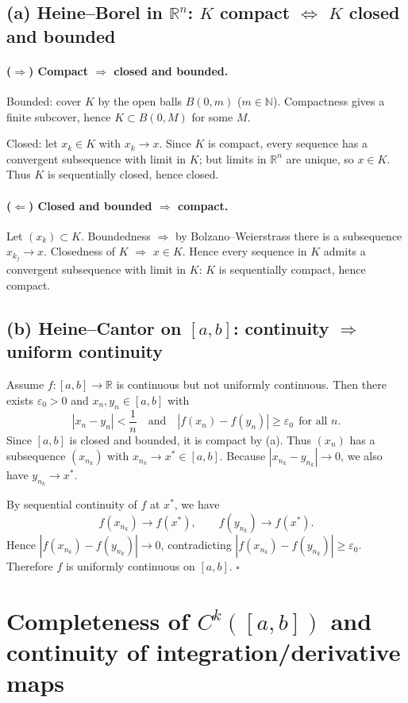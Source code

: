 \documentclass[12pt,a4paper]{article}
\newcommand{\qed}{\hfill$\square$}
\begin{document}
\subsection*{(a) Heine--Borel in $\mathbb{R}^n$: $K$ compact $\iff$ $K$ closed and bounded}

\paragraph{($\Rightarrow$) Compact $\Rightarrow$ closed and bounded.}
Bounded: cover $K$ by the open balls $B(0,m)$ ($m\in\mathbb{N}$). Compactness gives a finite subcover, hence
$K\subset B(0,M)$ for some $M$.

Closed: let $x_k\in K$ with $x_k\to x$. Since $K$ is compact, every sequence has a convergent subsequence
with limit in $K$; but limits in $\mathbb{R}^n$ are unique, so $x\in K$. Thus $K$ is sequentially closed, hence closed.

\paragraph{($\Leftarrow$) Closed and bounded $\Rightarrow$ compact.}
Let $(x_k)\subset K$. Boundedness $\Rightarrow$ by Bolzano--Weierstrass there is a subsequence $x_{k_j}\to x$.
Closedness of $K$ $\Rightarrow$ $x\in K$. Hence every sequence in $K$ admits a convergent subsequence with
limit in $K$: $K$ is sequentially compact, hence compact.

\subsection*{(b) Heine--Cantor on $[a,b]$: continuity $\Rightarrow$ uniform continuity}
Assume $f:[a,b]\to\mathbb{R}$ is continuous but not uniformly continuous. Then there exists $\varepsilon_0>0$
and $x_n,y_n\in[a,b]$ with
\[
|x_n-y_n|<\frac{1}{n}\quad\text{and}\quad |f(x_n)-f(y_n)|\ge \varepsilon_0\ \ \text{for all }n.
\]
Since $[a,b]$ is closed and bounded, it is compact by (a). Thus $(x_n)$ has a subsequence $(x_{n_k})$ with $x_{n_k}\to x^*\in[a,b]$.
Because $|x_{n_k}-y_{n_k}|\to 0$, we also have $y_{n_k}\to x^*$.

By sequential continuity of $f$ at $x^*$, we have
\[
f(x_{n_k}) \to f(x^*), \qquad f(y_{n_k}) \to f(x^*).
\]
Hence $|f(x_{n_k}) - f(y_{n_k})| \to 0$, contradicting $|f(x_{n_k}) - f(y_{n_k})| \ge \varepsilon_0$.
Therefore $f$ is uniformly continuous on $[a,b]$. \qed

\section*{Completeness of $C^k([a,b])$ and continuity of integration/derivative maps}
\end{document}
